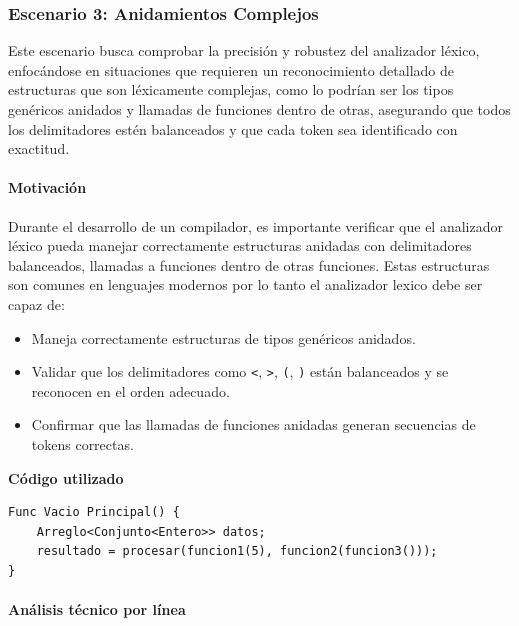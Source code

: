 \documentclass{article}
\begin{document}
\subsubsection{Escenario 3:  Anidamientos Complejos }

Este escenario busca comprobar la precisión y robustez del analizador léxico, enfocándose en situaciones que requieren un reconocimiento detallado de estructuras que son léxicamente complejas, como lo podrían ser los tipos genéricos anidados  y llamadas de funciones dentro de otras, asegurando que todos los delimitadores estén balanceados y que cada token sea identificado con exactitud.


\paragraph{Motivación}


Durante el desarrollo de un compilador, es importante verificar que el analizador léxico pueda manejar correctamente estructuras anidadas con delimitadores balanceados, llamadas a funciones dentro de otras funciones. Estas estructuras son comunes en lenguajes modernos por lo tanto el analizador lexico debe ser capaz de:

\begin{itemize}
  \item Maneja correctamente estructuras de tipos genéricos anidados.
  \item Validar que los delimitadores como \texttt{<}, \texttt{>}, \texttt{(}, \texttt{)} están balanceados y se reconocen en el orden adecuado.
  \item Confirmar que las llamadas de funciones anidadas generan secuencias de tokens correctas.
\end{itemize}

\textbf{Código utilizado}

\begin{lstlisting}[style=mypython, caption={ Fragmento con anidamientos léxicos complejos}]
Func Vacio Principal() {
    Arreglo<Conjunto<Entero>> datos;        
    resultado = procesar(funcion1(5), funcion2(funcion3()));  
}
\end{lstlisting}
\paragraph{Análisis técnico por línea}
\end{document}

